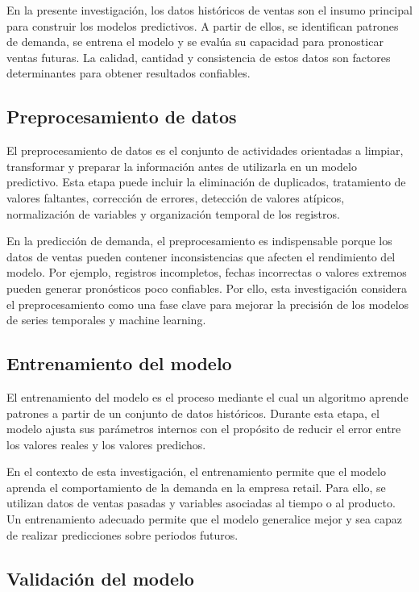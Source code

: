 En la presente investigación, los datos históricos de ventas son el insumo principal para construir los modelos predictivos. A partir de ellos, se identifican patrones de demanda, se entrena el modelo y se evalúa su capacidad para pronosticar ventas futuras. La calidad, cantidad y consistencia de estos datos son factores determinantes para obtener resultados confiables.

\subsection{Preprocesamiento de datos}

El preprocesamiento de datos es el conjunto de actividades orientadas a limpiar, transformar y preparar la información antes de utilizarla en un modelo predictivo. Esta etapa puede incluir la eliminación de duplicados, tratamiento de valores faltantes, corrección de errores, detección de valores atípicos, normalización de variables y organización temporal de los registros.

En la predicción de demanda, el preprocesamiento es indispensable porque los datos de ventas pueden contener inconsistencias que afecten el rendimiento del modelo. Por ejemplo, registros incompletos, fechas incorrectas o valores extremos pueden generar pronósticos poco confiables. Por ello, esta investigación considera el preprocesamiento como una fase clave para mejorar la precisión de los modelos de series temporales y machine learning.

\subsection{Entrenamiento del modelo}

El entrenamiento del modelo es el proceso mediante el cual un algoritmo aprende patrones a partir de un conjunto de datos históricos. Durante esta etapa, el modelo ajusta sus parámetros internos con el propósito de reducir el error entre los valores reales y los valores predichos.

En el contexto de esta investigación, el entrenamiento permite que el modelo aprenda el comportamiento de la demanda en la empresa retail. Para ello, se utilizan datos de ventas pasadas y variables asociadas al tiempo o al producto. Un entrenamiento adecuado permite que el modelo generalice mejor y sea capaz de realizar predicciones sobre periodos futuros.

\subsection{Validación del modelo}

